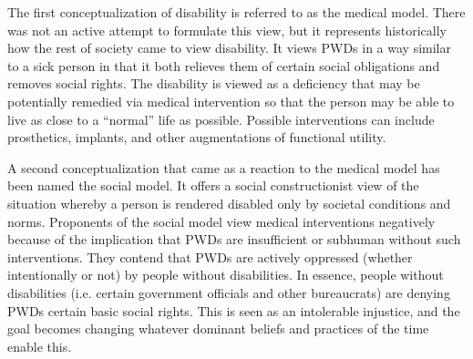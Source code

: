 \documentclass[a4paper]{article}
\begin{document}
The first conceptualization of disability is referred to as the medical model.
There was not an active attempt to formulate this view, but it represents
historically how the rest of society came to view disability. It views PWDs in
a way similar to a sick person in that it both relieves them of certain social
obligations and removes social rights. The disability is viewed as a
deficiency that may be potentially remedied via medical intervention so that
the person may be able to live as close to a ``normal'' life as possible.
Possible interventions can include prosthetics, implants, and other
augmentations of functional utility.

A second conceptualization that came as a reaction to the medical model has
been named the social model. It offers a social constructionist view of the
situation whereby a person is rendered disabled only by societal conditions
and norms. Proponents of the social model view medical interventions
negatively because of the implication that PWDs are insufficient or subhuman
without such interventions. They contend that PWDs are actively oppressed
(whether intentionally or not) by people without disabilities. In essence,
people without disabilities (i.e. certain government officials and other
bureaucrats) are denying PWDs certain basic social rights. This is seen as an
intolerable injustice, and the goal becomes changing whatever dominant beliefs
and practices of the time enable this. 
\end{document}

